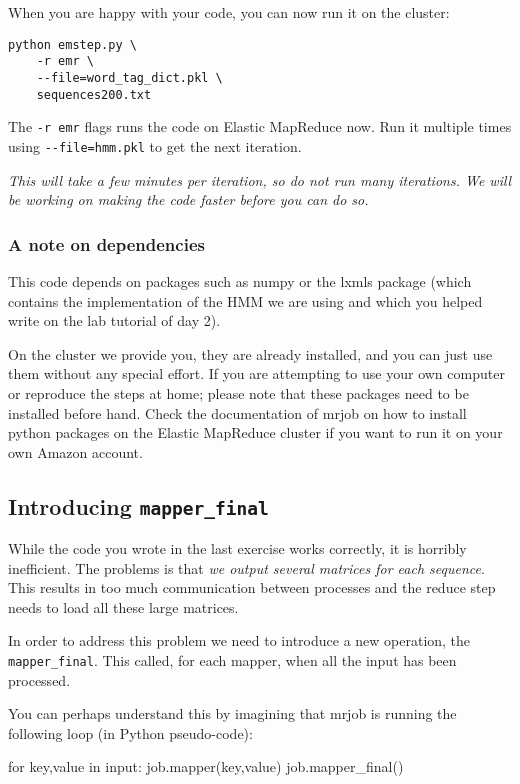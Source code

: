 When you are happy with your code, you can now run it on the cluster:

\begin{verbatim}
python emstep.py \
    -r emr \
    --file=word_tag_dict.pkl \
    sequences200.txt
\end{verbatim}

The \verb+-r emr+ flags runs the code on Elastic MapReduce now. Run it multiple
times using \verb+--file=hmm.pkl+ to get the next iteration.

\emph{This will take a few minutes per iteration, so do not run many
iterations. We will be working on making the code faster before you can do
so.}

\subsubsection{A note on dependencies}

This code depends on packages such as numpy or the lxmls package (which
contains the implementation of the HMM we are using and which you helped write
on the lab tutorial of day 2).

On the cluster we provide you, they are already installed, and you can just use
them without any special effort. If you are attempting to use your own computer
or reproduce the steps at home; please note that these packages need to be
installed before hand. Check the documentation of mrjob on how to install
python packages on the Elastic MapReduce cluster if you want to run it on your
own Amazon account.

\subsection{Introducing \texttt{mapper\_final}}

While the code you wrote in the last exercise works correctly, it is horribly
inefficient. The problems is that \emph{we output several matrices for each
sequence}. This results in too much communication between processes and the
reduce step needs to load all these large matrices.

In order to address this problem we need to introduce a new operation, the
\verb+mapper_final+. This called, for each mapper, when all the input has been
processed.

You can perhaps understand this by imagining that mrjob is running the
following loop (in Python pseudo-code):

\begin{python}
for key,value in input:
    job.mapper(key,value)
job.mapper_final()
\end{python}

